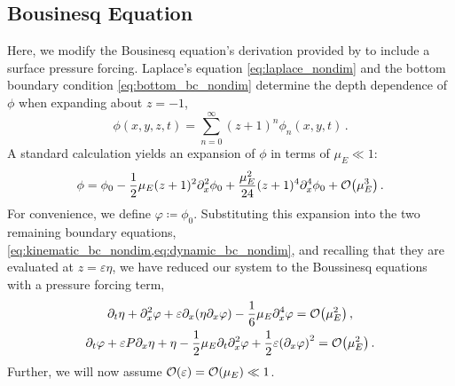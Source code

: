 \documentclass{jfm}
\renewcommand*{\epsilon}{\varepsilon}
\begin{document}
\subsection{Bousinesq Equation}
Here, we modify the Bousinesq equation's derivation provided by
\citet{mei2005nonlinear} to include a surface pressure forcing.
Laplace's equation \cref{eq:laplace_nondim} and the bottom boundary
condition \cref{eq:bottom_bc_nondim} determine the depth dependence of
$\phi$ when expanding about $z=-1$,
\begin{equation}
  \phi(x,y,z,t) = \sum_{n=0}^\infty (z+1)^n\phi_n(x,y,t) \,.
\end{equation}
A standard calculation \citep[\eg][]{mei2005nonlinear} yields an
expansion of $\phi$ in terms of $\mu_E \ll 1$:
\begin{equation}
  \phi = \phi_0 - \frac{1}{2}\mu_E (z+1)^2\partial^2_x\phi_0 +
  \frac{\mu_E^2}{24}(z+1)^4\partial^4_x\phi_0 +
  \order{\mu_E^3} \,.
\end{equation}
For convenience, we define $\varphi \coloneqq \phi_0$.
Substituting this expansion into the two remaining boundary equations,
\cref{eq:kinematic_bc_nondim,eq:dynamic_bc_nondim}, and recalling that
they are evaluated at $z=\epsilon \eta$, we have reduced our system to
the Boussinesq equations with a pressure forcing term,
\begin{gather}
  \partial_t \eta + \partial_x^2 \varphi + \epsilon \partial_x
    \pqty{\eta \partial_x \varphi} -\frac{1}{6}\mu_E \partial^4_x
    \varphi = \order{\mu_E^2} \label{eq:kinematic_bc_varphi} \,, \\
  \partial_t \varphi + \epsilon P \partial_x \eta + \eta -
    \frac{1}{2}\mu_E \partial_t \partial_x^2 \varphi +
    \frac{1}{2}\epsilon\pqty{\partial_x \varphi}^2 = \order{\mu_E^2} \,.
    \label{eq:dynamic_bc_varphi}
\end{gather}
Further, we will now assume $\order{\epsilon} = \order{\mu_E} \ll 1$.
\end{document}
